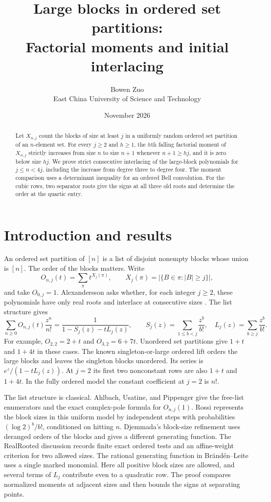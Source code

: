 \documentclass[11pt]{article}
\title{Large blocks in ordered set partitions:\\
Factorial moments and initial interlacing}
\author{Bowen Zuo\\[2pt]\small East China University of Science and Technology}
\date{November 2026}
\begin{document}
\maketitle
\begin{abstract}
Let \(X_{n,j}\) count the blocks of size at least \(j\) in a uniformly random ordered set partition of an \(n\)-element set. For every \(j\ge2\) and \(h\ge1\), the \(h\)th falling factorial moment of \(X_{n,j}\) strictly increases from size \(n\) to size \(n+1\) whenever \(n+1\ge hj\), and it is zero below size \(hj\). We prove strict consecutive interlacing of the large-block polynomials for \(j\le n<4j\), including the increase from degree three to degree four. The moment comparison uses a determinant inequality for an ordered Bell convolution. For the cubic rows, two separator roots give the signs at all three old roots and determine the order at the quartic entry.
\end{abstract}

\section{Introduction and results}

An ordered set partition of \([n]\) is a list of disjoint nonempty blocks whose union is \([n]\). The order of the blocks matters. Write
\[
O_{n,j}(t)=\sum_{\pi}t^{X_j(\pi)},\qquad X_j(\pi)=|\{B\in\pi:|B|\ge j\}|,
\]
and take \(O_{0,j}=1\). Alexandersson asks whether, for each integer \(j\ge2\), these polynomials have only real roots and interlace at consecutive sizes \cite{alex}. The list structure gives
\[
\sum_{n\ge0}O_{n,j}(t)\frac{z^n}{n!}
 =\frac{1}{1-S_j(z)-tL_j(z)},\qquad
S_j(z)=\sum_{1\le b<j}\frac{z^b}{b!},\quad L_j(z)=\sum_{b\ge j}\frac{z^b}{b!}.
\]
For example, \(O_{2,2}=2+t\) and \(O_{3,2}=6+7t\). Unordered set partitions give \(1+t\) and \(1+4t\) in these cases.
The known singleton-or-large ordered lift \cite{lift} orders the large blocks and
leaves the singleton blocks unordered. Its series is \(e^z/(1-tL_j(z))\).
At \(j=2\) its first two nonconstant rows are also \(1+t\) and \(1+4t\).
In the fully ordered model the constant coefficient at \(j=2\) is \(n!\).

The list structure is classical. Ahlbach, Usatine, and Pippenger
\cite[Eq.~(2) and Theorems~4 and~14]{aup} give the free-list enumerators
and the exact complex-pole formula for \(O_{n,j}(1)\).
Rossi \cite[Proposition~2.1 and Remark~2.2]{rossi} represents the block sizes
in this uniform model by independent steps with probabilities
\((\log 2)^b/b!\), conditioned on hitting \(n\).
Djemmada's block-size refinement \cite[Theorem~4.10]{djemmada} uses
deranged orders of the blocks and gives a different generating function.
The RealRooted discussion \cite{rr} records finite exact ordered tests and
an affine-weight criterion for two allowed sizes. The rational generating
function in Br\"and\'en--Leite \cite[Theorem~4.5]{bl} uses a single marked
monomial. Here all positive block sizes are allowed, and several terms of
\(L_j\) contribute even to a quadratic row. The proof compares normalized
moments at adjacent sizes and then bounds the signs at separating points.
\end{document}
